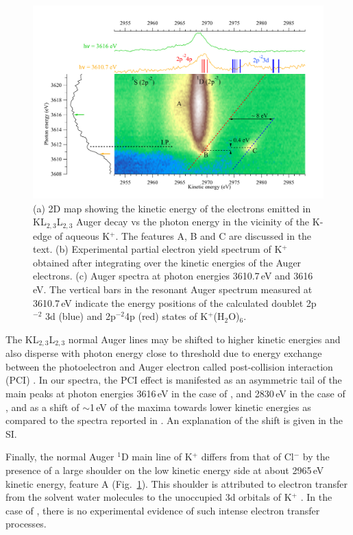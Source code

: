\begin{figure}[h!]
\centering
\includegraphics[scale=0.55]{figures/k_2dmap.pdf}
\caption{(a) 2D map showing the kinetic energy of the electrons emitted in KL$_{2,3}$L$_{2,3}$ Auger decay vs the photon energy in the vicinity of the K-edge of aqueous K$^{+}$. The features A, B and C are discussed in the text.
(b) Experimental partial electron yield spectrum of K$^{+}$ obtained after integrating over the kinetic energies of the Auger electrons.
(c) Auger spectra at photon energies 3610.7\,eV and 3616\,eV. The vertical bars in the resonant Auger spectrum measured at 3610.7\,eV indicate the energy positions of the calculated doublet 2p$^{-2}$ 3d (blue) and 2p$^{-2}$4p (red) states of K$^{+}$(H$_2$O)$_6$.}
\label{fg:2dmap_k}
\end{figure}


The KL$_{2,3}$L$_{2,3}$ normal Auger lines may be shifted to higher kinetic energies and also disperse with photon energy close to threshold due to energy exchange between the photoelectron and Auger electron called post-collision interaction (PCI) \citep{russek86:911,guillemin15:012503}. In our spectra, the PCI effect is manifested as an asymmetric tail of the main peaks at photon energies 3616\,eV in the case of \ki, and 2830\,eV in the case of \cli, and as a shift of $\sim$1\,eV of the maxima towards lower kinetic energies as compared to the spectra reported in \citep{ceolin17:263003}. An explanation of the shift is given in the SI.


Finally, the normal Auger $^1$D main line of K$^{+}$ differs from that of Cl$^{-}$ by the presence of a large shoulder on the low kinetic energy side at about 2965\,eV kinetic energy, feature A (Fig.\ \ref{fg:2dmap_k}). This shoulder is attributed to electron transfer from the solvent water molecules to the unoccupied 3d orbitals of K$^{+}$ \citep{ceolin17:263003}. In the case of \cli, there is no experimental evidence of such intense electron transfer processes.


